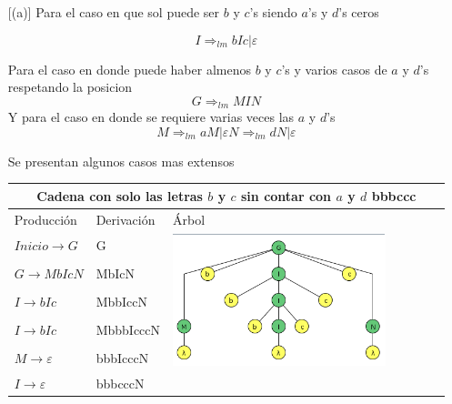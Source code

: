 \documentclass{article}
\begin{document}
\begin{enumerate} [(a)]
            Para el caso en que sol puede ser $b$ y $c$'s siendo $a$'s y $d$'s ceros
            
            \[ 
                I \Rightarrow_{lm} bIc | \varepsilon 
            \]
            
            Para el caso en donde puede haber almenos $b$ y $c$'s y varios casos de $a$ y $d$'s respetando la posicion
            \[ 
                G \Rightarrow_{lm} MIN 
            \]
            Y para el caso en donde se requiere varias veces las $a$ y $d$'s
            \[ 
                M \Rightarrow_{lm} aM | \varepsilon
                N \Rightarrow_{lm} dN | \varepsilon
            \]
            
            Se presentan algunos casos mas extensos
            
            \begin{tabular}{|p{5cm}|p{5cm}|p{5cm}|  }
            \hline
            \multicolumn{3}{|c|}{Cadena con solo las letras $b$ y $c$ sin contar con $a$ y $d$ bbbccc} \\
            \hline
            Producción & Derivación & Árbol\\
            \hline
            $ Inicio \to G$ & G & \multirow{5}{*}{
            \centering
            \begin{minipage}{.3\textwidth}
            \includegraphics[width=0.8\textwidth]{img/eje_d_caso1.png}
            \end{minipage}
            } \\
             $ G \to MbIcN$ & MbIcN & \\
             $ I \to bIc$ & MbbIccN & \\
             $ I \to bIc$ & MbbbIcccN & \\
             $ M \to \varepsilon$ & bbbIcccN &\\
             $ I \to \varepsilon$ & bbbcccN &\\

\end{tabular}
\end{enumerate}
\end{document}
